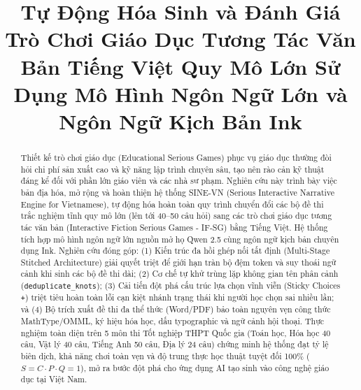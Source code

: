 \documentclass[conference]{IEEEtran}
\begin{document}
\title{Tự Động Hóa Sinh và Đánh Giá Trò Chơi Giáo Dục Tương Tác Văn Bản Tiếng Việt Quy Mô Lớn Sử Dụng Mô Hình Ngôn Ngữ Lớn và Ngôn Ngữ Kịch Bản Ink}

\author{
\and
{}
}

\maketitle

\begin{abstract}
Thiết kế trò chơi giáo dục (Educational Serious Games) phục vụ giáo dục thường đòi hỏi chi phí sản xuất cao và kỹ năng lập trình chuyên sâu, tạo nên rào cản kỹ thuật đáng kể đối với phần lớn giáo viên và các nhà sư phạm. Nghiên cứu này trình bày việc bản địa hóa, mở rộng và hoàn thiện hệ thống SINE-VN (Serious Interactive Narrative Engine for Vietnamese), tự động hóa hoàn toàn quy trình chuyển đổi các bộ đề thi trắc nghiệm tĩnh quy mô lớn (lên tới 40--50 câu hỏi) sang các trò chơi giáo dục tương tác văn bản (Interactive Fiction Serious Games - IF-SG) bằng Tiếng Việt. Hệ thống tích hợp mô hình ngôn ngữ lớn nguồn mở họ Qwen 2.5 cùng ngôn ngữ kịch bản chuyên dụng Ink. Nghiên cứu đóng góp: (1) Kiến trúc đa hồi ghép nối tất định (Multi-Stage Stitched Architecture) giải quyết triệt để giới hạn tràn bộ đệm token và suy thoái ngữ cảnh khi sinh các bộ đề thi dài; (2) Cơ chế tự khử trùng lặp không gian tên phân cảnh (\texttt{deduplicate\_knots}); (3) Cải tiến đột phá cấu trúc lựa chọn vĩnh viễn (Sticky Choices \texttt{+}) triệt tiêu hoàn toàn lỗi cạn kiệt nhánh trạng thái khi người học chọn sai nhiều lần; và (4) Bộ trích xuất đề thi đa thể thức (Word/PDF) bảo toàn nguyên vẹn công thức MathType/OMML, ký hiệu hóa học, dấu typographic và ngữ cảnh hội thoại. Thực nghiệm toàn diện trên 5 môn thi Tốt nghiệp THPT Quốc gia (Toán học, Hóa học 40 câu, Vật lý 40 câu, Tiếng Anh 50 câu, Địa lý 24 câu) chứng minh hệ thống đạt tỷ lệ biên dịch, khả năng chơi toàn vẹn và độ trung thực học thuật tuyệt đối 100\% ($S = C \cdot P \cdot Q = 1$), mở ra bước đột phá cho ứng dụng AI tạo sinh vào công nghệ giáo dục tại Việt Nam.
\end{abstract}
\end{document}
